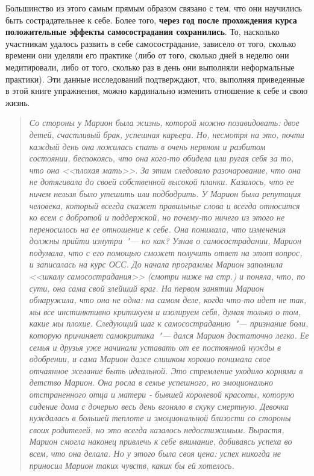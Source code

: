Большинство из этого самым прямым образом связано с тем, что они научились быть сострадательнее к себе. Более того, \textbf{через год после прохождения курса положительные эффекты самосострадания сохранились}. То, насколько участникам удалось развить в себе самосострадание, зависело от того, сколько времени они уделяли его практике (либо от того, сколько дней в неделю они медитировали, либо от того, сколько раз в день они выполняли неформальные практики). Эти данные исследований подтверждают, что, выполняя приведенные в этой книге упражнения, можно кардинально изменить отношение к себе и свою жизнь.

\begin{quotation}
	\textit{Со стороны у Марион была жизнь, которой можно позавидовать: двое детей, счастливый брак, успешная карьера. Но, несмотря на это, почти каждый день она ложилась спать в очень нервном и разбитом состоянии, беспокоясь, что она кого-то обидела или ругая себя за то, что она <<плохая мать>>. За этим следовало разочарование, что она не дотягивала до своей собственной высокой планки. Казалось, что ее ничем нельзя было утешить или подбодрить. У Марион была репутация человека, который всегда скажет правильные слова и всегда относится ко всем с добротой и поддержкой, но почему-то ничего из этого не переносилось на ее отношение к себе. Она понимала, что изменения должны прийти изнутри~"--- но как? Узнав о самосострадании, Марион подумала, что с его помощью сможет получить ответ на этот вопрос, и записалась на курс ОСС. До начала программы Марион заполнила <<шкалу самосострадания>> (смотри ниже на стр.\:\pageref{Ex:The_Self-Compassion_Scale}) и поняла, что, по сути, она сама свой злейший враг. На первом занятии Марион обнаружила, что она не одна: на самом деле, когда что-то идет не так, мы все инстинктивно критикуем и изолируем себя, думая только о том, какие мы плохие. Следующий шаг к самосостраданию~"--- признание боли, которую причиняет самокритика~"--- дался Марион достаточно легко. Ее семья и друзья уже начинали уставать от ее постоянной нужды в одобрении, и сама Марион даже слишком хорошо понимала свое отчаянное желание быть идеальной. Это стремление уходило корнями в детство Марион. Она росла в семье успешного, но эмоционально отстраненного отца и матери - бывшей королевой красоты, которую сидение дома с дочерью весь день вгоняло в скуку смертную. Девочка нуждалась в большей теплоте и эмоциональной близости со стороны своих родителей, но это всегда казалось недостижимым. Вырастя, Марион смогла наконец привлечь к себе внимание, добиваясь успеха во всем, что она делала. Но у этого была своя цена: успех никогда не приносил Марион таких чувств, каких бы ей хотелось.} 
	

\end{quotation}
